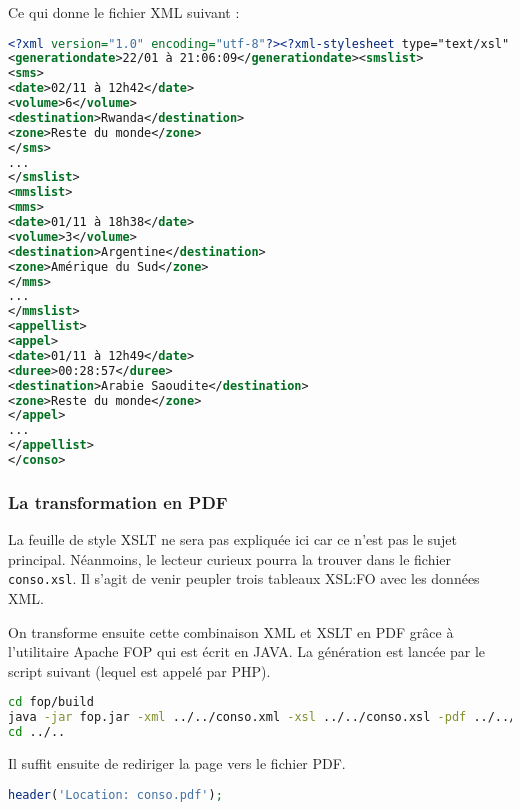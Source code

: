 Ce qui donne le fichier XML suivant :

\begin{lstlisting}[language=xml]
	<?xml version="1.0" encoding="utf-8"?><?xml-stylesheet type="text/xsl" href="conso.xsl"?><conso>
<generationdate>22/01 à 21:06:09</generationdate><smslist>
<sms>
<date>02/11 à 12h42</date>
<volume>6</volume>
<destination>Rwanda</destination>
<zone>Reste du monde</zone>
</sms>
...
</smslist>
<mmslist>
<mms>
<date>01/11 à 18h38</date>
<volume>3</volume>
<destination>Argentine</destination>
<zone>Amérique du Sud</zone>
</mms>
...
</mmslist>
<appellist>
<appel>
<date>01/11 à 12h49</date>
<duree>00:28:57</duree>
<destination>Arabie Saoudite</destination>
<zone>Reste du monde</zone>
</appel>
...
</appellist>
</conso>
\end{lstlisting}


\subsubsection{La transformation en PDF}
La feuille de style XSLT ne sera pas expliquée ici car ce n'est pas le sujet principal. Néanmoins, le lecteur curieux pourra la trouver dans le fichier \texttt{conso.xsl}. Il s'agit de venir peupler trois tableaux XSL:FO avec les données XML.

On transforme ensuite cette combinaison XML et XSLT en PDF grâce à l'utilitaire Apache FOP qui est écrit en JAVA.
La génération est lancée par le script suivant (lequel est appelé par PHP).

\begin{lstlisting}[language=bash]
cd fop/build
java -jar fop.jar -xml ../../conso.xml -xsl ../../conso.xsl -pdf ../../conso.pdf
cd ../..
\end{lstlisting}

Il suffit ensuite de rediriger la page vers le fichier PDF.

\begin{lstlisting}[language=php]
header('Location: conso.pdf');
\end{lstlisting}

